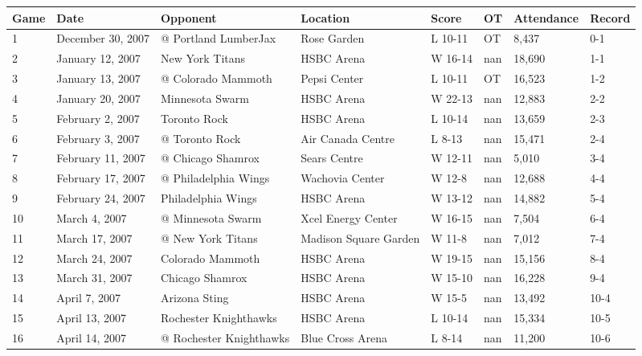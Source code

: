 \documentclass{article}
\begin{document}
\begin{tabular}{llllllll}
\toprule
Game & Date & Opponent & Location & Score & OT & Attendance & Record \\
\midrule
1 & December 30, 2007 & @ Portland LumberJax & Rose Garden & L 10-11 & OT & 8,437 & 0-1 \\
2 & January 12, 2007 & New York Titans & HSBC Arena & W 16-14 & nan & 18,690 & 1-1 \\
3 & January 13, 2007 & @ Colorado Mammoth & Pepsi Center & L 10-11 & OT & 16,523 & 1-2 \\
4 & January 20, 2007 & Minnesota Swarm & HSBC Arena & W 22-13 & nan & 12,883 & 2-2 \\
5 & February 2, 2007 & Toronto Rock & HSBC Arena & L 10-14 & nan & 13,659 & 2-3 \\
6 & February 3, 2007 & @ Toronto Rock & Air Canada Centre & L 8-13 & nan & 15,471 & 2-4 \\
7 & February 11, 2007 & @ Chicago Shamrox & Sears Centre & W 12-11 & nan & 5,010 & 3-4 \\
8 & February 17, 2007 & @ Philadelphia Wings & Wachovia Center & W 12-8 & nan & 12,688 & 4-4 \\
9 & February 24, 2007 & Philadelphia Wings & HSBC Arena & W 13-12 & nan & 14,882 & 5-4 \\
10 & March 4, 2007 & @ Minnesota Swarm & Xcel Energy Center & W 16-15 & nan & 7,504 & 6-4 \\
11 & March 17, 2007 & @ New York Titans & Madison Square Garden & W 11-8 & nan & 7,012 & 7-4 \\
12 & March 24, 2007 & Colorado Mammoth & HSBC Arena & W 19-15 & nan & 15,156 & 8-4 \\
13 & March 31, 2007 & Chicago Shamrox & HSBC Arena & W 15-10 & nan & 16,228 & 9-4 \\
14 & April 7, 2007 & Arizona Sting & HSBC Arena & W 15-5 & nan & 13,492 & 10-4 \\
15 & April 13, 2007 & Rochester Knighthawks & HSBC Arena & L 10-14 & nan & 15,334 & 10-5 \\
16 & April 14, 2007 & @ Rochester Knighthawks & Blue Cross Arena & L 8-14 & nan & 11,200 & 10-6 \\
\bottomrule
\end{tabular}
\end{document}

